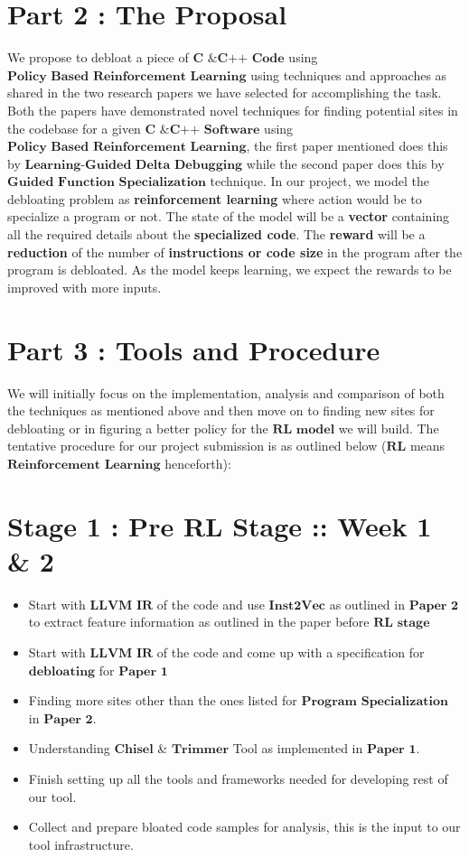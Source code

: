 \documentclass{article} %
\begin{document}
\section*{Part 2 : The Proposal}
We propose to debloat a piece of $\textbf{C \& C++ Code}$ using $\textbf{Policy Based Reinforcement Learning}$ using techniques and approaches as shared in the two research papers we have selected for accomplishing the task. Both the papers have demonstrated novel techniques for finding potential sites in the codebase for a given $\textbf{C \& C++ Software}$ using $\textbf{Policy Based Reinforcement Learning}$, the first paper mentioned does this by $\textbf{Learning-Guided Delta Debugging}$  while the second paper does this by $\textbf{Guided Function Specialization}$ technique. In our  project, we model the debloating problem as \textbf{reinforcement learning} where action would be to specialize a program or not. The state of the model will be a \textbf{vector} containing all the required details about the \textbf{specialized code}. The \textbf{reward} will be a \textbf{reduction} of the number of \textbf{instructions or code size} in the program after the program is debloated. As the model keeps learning, we expect the rewards to be improved with more inputs. 

\section*{Part 3 : Tools and Procedure}
We will initially focus on the implementation, analysis and comparison of both the techniques as mentioned above and then move on to finding new sites for debloating or in figuring a better policy for the $\textbf{RL model}$ we will build. The tentative procedure for our project submission is as outlined below ($\textbf{RL}$ means $\textbf{Reinforcement Learning}$ henceforth):
\section*{Stage 1 : Pre RL Stage :: Week 1 \& 2}
\begin{itemize}
    \item Start with $\textbf{LLVM IR}$ of the code and use $\textbf{Inst2Vec}$ as outlined in $\textbf{Paper 2}$ to extract feature information as outlined in the paper before $\textbf{RL stage}$
    \item Start with $\textbf{LLVM IR}$ of the code and come up with a specification for $\textbf{debloating}$ for $\textbf{Paper 1}$
    \item Finding more sites other than the ones listed for $\textbf{Program Specialization}$ in $\textbf{Paper 2}$.  
    \item Understanding $\textbf{Chisel}$ \& $\textbf{Trimmer}$ Tool as implemented in $\textbf{Paper 1}$.
    \item Finish setting up all the tools and frameworks needed for developing rest of our tool. 
    \item Collect and prepare bloated code samples for analysis, this is the input to our tool infrastructure. 
\end{itemize}
\end{document}
